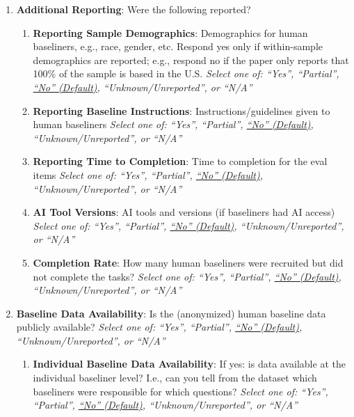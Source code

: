 \documentclass{article}
\begin{document}
\begin{enumerate}[leftmargin=30pt, topsep=0pt, itemsep=0pt]
    \item \textbf{Additional Reporting}: Were the following reported?
    \begin{enumerate}
        \item \textbf{Reporting Sample Demographics}: Demographics for human baseliners, e.g., race, gender, etc. Respond yes only if within-sample demographics are reported; e.g., respond no if the paper only reports that 100\% of the sample is based in the U.S.
        \newline \textit{Select one of: ``Yes'', ``Partial'', \ul{``No'' (Default)}, ``Unknown/Unreported'', or ``N/A''}
        
        \item \textbf{Reporting Baseline Instructions}: Instructions/guidelines given to human baseliners
        \newline \textit{Select one of: ``Yes'', ``Partial'', \ul{``No'' (Default)}, ``Unknown/Unreported'', or ``N/A''}
        
        \item \textbf{Reporting Time to Completion}: Time to completion for the eval items
        \newline \textit{Select one of: ``Yes'', ``Partial'', \ul{``No'' (Default)}, ``Unknown/Unreported'', or ``N/A''}
        
        \item \textbf{AI Tool Versions}: AI tools and versions (if baseliners had AI access)
        \newline \textit{Select one of: ``Yes'', ``Partial'', \ul{``No'' (Default)}, ``Unknown/Unreported'', or ``N/A''}

        \item \textbf{Completion Rate}: How many human baseliners were recruited but did not complete the tasks?
        \newline \textit{Select one of: ``Yes'', ``Partial'', \ul{``No'' (Default)}, ``Unknown/Unreported'', or ``N/A''}
    \end{enumerate}
    
    \item \textbf{Baseline Data Availability}: Is the (anonymized) human baseline data publicly available?
    \newline \textit{Select one of: ``Yes'', ``Partial'', \ul{``No'' (Default)}, ``Unknown/Unreported'', or ``N/A''}
    \begin{enumerate}
        \item \textbf{Individual Baseline Data Availability}: If yes: is data available at the individual baseliner level? I.e., can you tell from the dataset which baseliners were responsible for which questions?
        \newline \textit{Select one of: ``Yes'', ``Partial'', \ul{``No'' (Default)}, ``Unknown/Unreported'', or ``N/A''}
        

\end{enumerate}
\end{enumerate}
\end{document}
